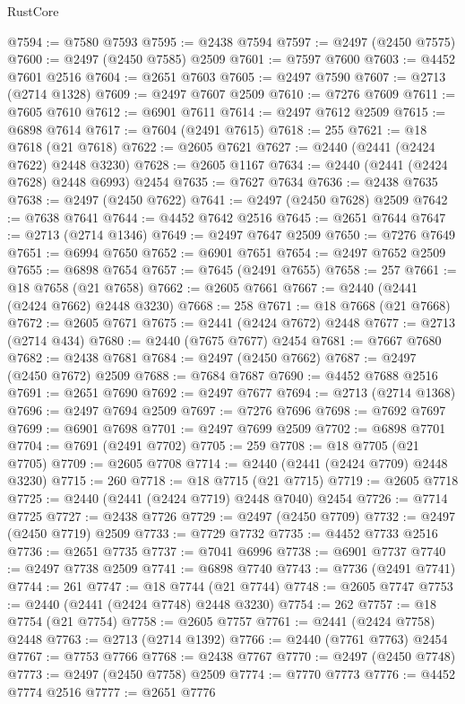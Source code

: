 \begin{lexlean}{RustCore}
\begin{coremodule}
@7594 := @7580 @7593
@7595 := @2438 @7594
@7597 := @2497 (@2450 @7575)
@7600 := @2497 (@2450 @7585) @2509
@7601 := @7597 @7600
@7603 := @4452 @7601 @2516
@7604 := @2651 @7603
@7605 := @2497 @7590
@7607 := @2713 (@2714 @1328)
@7609 := @2497 @7607 @2509
@7610 := @7276 @7609
@7611 := @7605 @7610
@7612 := @6901 @7611
@7614 := @2497 @7612 @2509
@7615 := @6898 @7614
@7617 := @7604 (@2491 @7615)
@7618 := 255
@7621 := @18 @7618 (@21 @7618)
@7622 := @2605 @7621
@7627 := @2440 (@2441 (@2424 @7622) @2448 @3230)
@7628 := @2605 @1167
@7634 := @2440 (@2441 (@2424 @7628) @2448 @6993) @2454
@7635 := @7627 @7634
@7636 := @2438 @7635
@7638 := @2497 (@2450 @7622)
@7641 := @2497 (@2450 @7628) @2509
@7642 := @7638 @7641
@7644 := @4452 @7642 @2516
@7645 := @2651 @7644
@7647 := @2713 (@2714 @1346)
@7649 := @2497 @7647 @2509
@7650 := @7276 @7649
@7651 := @6994 @7650
@7652 := @6901 @7651
@7654 := @2497 @7652 @2509
@7655 := @6898 @7654
@7657 := @7645 (@2491 @7655)
@7658 := 257
@7661 := @18 @7658 (@21 @7658)
@7662 := @2605 @7661
@7667 := @2440 (@2441 (@2424 @7662) @2448 @3230)
@7668 := 258
@7671 := @18 @7668 (@21 @7668)
@7672 := @2605 @7671
@7675 := @2441 (@2424 @7672) @2448
@7677 := @2713 (@2714 @434)
@7680 := @2440 (@7675 @7677) @2454
@7681 := @7667 @7680
@7682 := @2438 @7681
@7684 := @2497 (@2450 @7662)
@7687 := @2497 (@2450 @7672) @2509
@7688 := @7684 @7687
@7690 := @4452 @7688 @2516
@7691 := @2651 @7690
@7692 := @2497 @7677
@7694 := @2713 (@2714 @1368)
@7696 := @2497 @7694 @2509
@7697 := @7276 @7696
@7698 := @7692 @7697
@7699 := @6901 @7698
@7701 := @2497 @7699 @2509
@7702 := @6898 @7701
@7704 := @7691 (@2491 @7702)
@7705 := 259
@7708 := @18 @7705 (@21 @7705)
@7709 := @2605 @7708
@7714 := @2440 (@2441 (@2424 @7709) @2448 @3230)
@7715 := 260
@7718 := @18 @7715 (@21 @7715)
@7719 := @2605 @7718
@7725 := @2440 (@2441 (@2424 @7719) @2448 @7040) @2454
@7726 := @7714 @7725
@7727 := @2438 @7726
@7729 := @2497 (@2450 @7709)
@7732 := @2497 (@2450 @7719) @2509
@7733 := @7729 @7732
@7735 := @4452 @7733 @2516
@7736 := @2651 @7735
@7737 := @7041 @6996
@7738 := @6901 @7737
@7740 := @2497 @7738 @2509
@7741 := @6898 @7740
@7743 := @7736 (@2491 @7741)
@7744 := 261
@7747 := @18 @7744 (@21 @7744)
@7748 := @2605 @7747
@7753 := @2440 (@2441 (@2424 @7748) @2448 @3230)
@7754 := 262
@7757 := @18 @7754 (@21 @7754)
@7758 := @2605 @7757
@7761 := @2441 (@2424 @7758) @2448
@7763 := @2713 (@2714 @1392)
@7766 := @2440 (@7761 @7763) @2454
@7767 := @7753 @7766
@7768 := @2438 @7767
@7770 := @2497 (@2450 @7748)
@7773 := @2497 (@2450 @7758) @2509
@7774 := @7770 @7773
@7776 := @4452 @7774 @2516
@7777 := @2651 @7776

\end{coremodule}
\end{lexlean}
